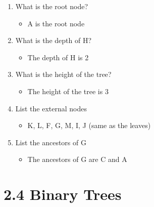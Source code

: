 \documentclass[11pt]{article}
\begin{document}
\begin{enumerate}
    \item What is the root node?
    \begin{itemize}
        \item A is the root node
    \end{itemize}
    
    \item What is the depth of H?
    \begin{itemize}
        \item The depth of H is 2
    \end{itemize}
    
    \item What is the height of the tree?
    \begin{itemize}
        \item The height of the tree is 3
    \end{itemize}
    
    \item List the external nodes
    \begin{itemize}
        \item K, L, F, G, M, I, J (same as the leaves)
    \end{itemize}
    
    \item List the ancestors of G
    \begin{itemize}
        \item The ancestors of G are C and A
    \end{itemize}
    
\end{enumerate}

\section*{2.4 Binary Trees}
\end{document}

